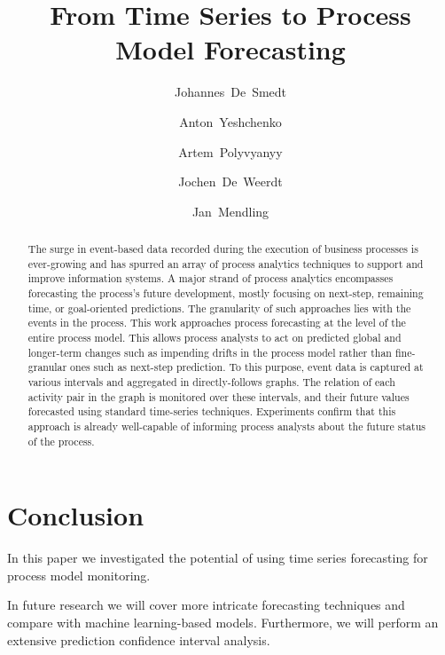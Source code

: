 \documentclass{svproc}
\begin{document}
\mainmatter      
%
\title{From Time Series to Process Model Forecasting}
%
%
\author{Johannes~De~Smedt \and Anton~Yeshchenko \and Artem~Polyvyanyy \and Jochen~De~Weerdt \and Jan~Mendling}
%
%
\maketitle              

\begin{abstract}
The surge in event-based data recorded during the execution of business processes is ever-growing and has spurred an array of process analytics techniques to support and improve information systems.
A major strand of process analytics encompasses forecasting the process's future development, mostly focusing on next-step, remaining time, or goal-oriented predictions.
The granularity of such approaches lies with the events in the process.
This work approaches process forecasting at the level of the entire process model.
This allows process analysts to act on predicted global and longer-term changes such as impending drifts in the process model rather than fine-granular ones such as next-step prediction.
To this purpose, event data is captured at various intervals and aggregated in directly-follows graphs.
The relation of each activity pair in the graph is monitored over these intervals, and their future values forecasted using standard time-series techniques.
Experiments confirm that this approach is already well-capable of informing process analysts about the future status of the process.
\end{abstract}
%






\section{Conclusion}\label{sec:conclusion}
In this paper we investigated the potential of using time series forecasting for process model monitoring.

In future research we will cover more intricate forecasting techniques and compare with machine learning-based models.
Furthermore, we will perform an extensive prediction confidence interval analysis.



\end{document}
